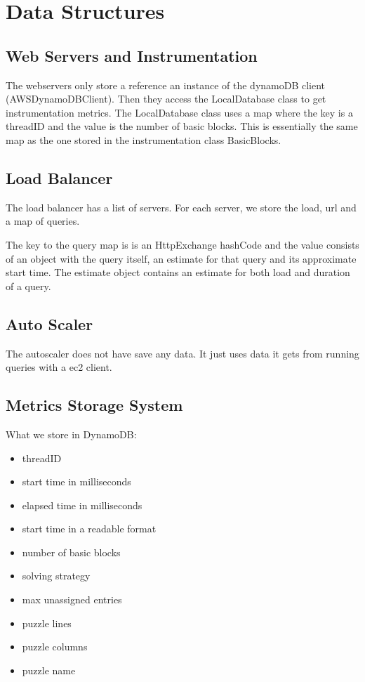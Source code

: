 \documentclass[10pt,twocolumn]{article}
\begin{document}
\section{Data Structures}

\subsection*{Web Servers and Instrumentation}

The webservers only store a reference an instance of the dynamoDB client (AWSDynamoDBClient).
Then they access the LocalDatabase class to get instrumentation metrics. The LocalDatabase class uses a map where the key is a threadID and the value
is the number of basic blocks. This is essentially the same map as the one stored in the instrumentation class BasicBlocks.

\subsection*{Load Balancer}

The load balancer has a list of servers. For each server, we store the load, url and a map of queries.

The key to the query map is is an HttpExchange hashCode and the value consists of an object with the query itself, an estimate for that query and its approximate start time.
The estimate object contains an estimate for both load and duration of a query.

\subsection*{Auto Scaler}

The autoscaler does not have save any data. It just uses data it gets from running queries with a ec2 client.

\subsection*{Metrics Storage System}

What we store in DynamoDB:

\begin{itemize}
    \setlength\itemsep{0em}
    \item threadID
    \item start time in milliseconds
    \item elapsed time in milliseconds
    \item start time in a readable format
    \item number of basic blocks
    \item solving strategy
    \item max unassigned entries
    \item puzzle lines
    \item puzzle columns
    \item puzzle name
\end{itemize}
\end{document}
